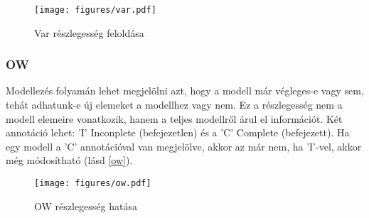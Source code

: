 \begin{figure}[htp]
	\centering
	\texttt{[image: figures/var.pdf]}
	\caption{Var részlegesség feloldása} 
	\label{var}
\end{figure}

\subsubsection{OW}
Modellezés folyamán lehet megjelölni azt, hogy a modell már végleges-e vagy sem, tehát adhatunk-e új elemeket a modellhez vagy nem. Ez a részlegesség nem a modell elemeire vonatkozik, hanem a teljes modellről árul el információt. Két annotáció lehet: \textsf{’I’} Inconplete (befejezetlen) és a \textsf{’C’} Complete (befejezett). Ha egy modell a \textsf{’C’} annotációval van megjelölve, akkor az már nem, ha \textsf{’I’}-vel, akkor még módosítható (lásd \autoref{ow}).

\begin{figure}[htp]
	\centering
	\texttt{[image: figures/ow.pdf]}
	\caption{OW részlegesség hatása} 
	\label{ow}
\end{figure}